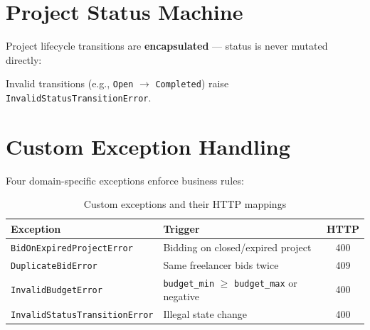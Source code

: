 \documentclass[12pt, a4paper]{report}
\begin{document}
\section{Project Status Machine}

Project lifecycle transitions are \textbf{encapsulated} --- status is never mutated directly:

\begin{center}
\end{center}

Invalid transitions (e.g., \texttt{Open} $\to$ \texttt{Completed}) raise \texttt{InvalidStatusTransitionError}.

\section{Custom Exception Handling}

Four domain-specific exceptions enforce business rules:

\begin{table}[H]
\centering
\caption{Custom exceptions and their HTTP mappings}
\begin{tabular}{@{}llc@{}}
\toprule
\textbf{Exception} & \textbf{Trigger} & \textbf{HTTP} \\
\midrule
\texttt{BidOnExpiredProjectError} & Bidding on closed/expired project & 400 \\
\texttt{DuplicateBidError} & Same freelancer bids twice & 409 \\
\texttt{InvalidBudgetError} & \texttt{budget\_min} $\geq$ \texttt{budget\_max} or negative & 400 \\
\texttt{InvalidStatusTransitionError} & Illegal state change & 400 \\
\bottomrule
\end{tabular}
\end{table}
\end{document}
